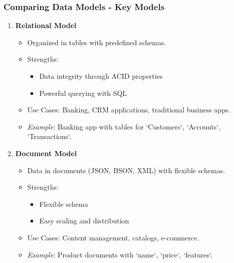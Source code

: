 \documentclass[aspectratio=169]{beamer}
\begin{document}
\begin{frame}[fragile]
    \frametitle{Comparing Data Models - Key Models}
    \begin{enumerate}
        \item \textbf{Relational Model}
            \begin{itemize}
                \item Organized in tables with predefined schemas.
                \item Strengths:
                    \begin{itemize}
                        \item Data integrity through ACID properties
                        \item Powerful querying with SQL
                    \end{itemize}
                \item Use Cases: Banking, CRM applications, traditional business apps.
                \item \textit{Example}: Banking app with tables for `Customers`, `Accounts`, `Transactions`.
            \end{itemize}
            
        \item \textbf{Document Model}
            \begin{itemize}
                \item Data in documents (JSON, BSON, XML) with flexible schemas.
                \item Strengths:
                    \begin{itemize}
                        \item Flexible schema
                        \item Easy scaling and distribution
                    \end{itemize}
                \item Use Cases: Content management, catalogs, e-commerce.
                \item \textit{Example}: Product documents with `name`, `price`, `features`.
            \end{itemize}
    \end{enumerate}
\end{frame}
\end{document}
